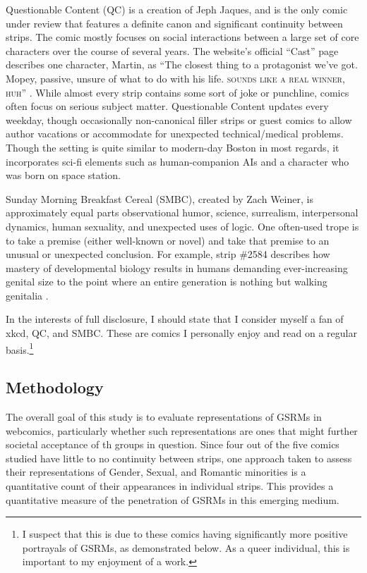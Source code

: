 \documentclass[man,12pt]{apa6}
\begin{document}
Questionable Content (QC) is a creation of Jeph Jaques, and is the only comic under review that features a definite canon and significant continuity between strips. The comic mostly focuses on social interactions between a large set of core characters over the course of several years. The website's official ``Cast'' page describes one character, Martin, as ``The closest thing to a protagonist we've got. Mopey, passive, unsure of what to do with his life. \textsc{sounds like a real winner, huh}'' \cite{qc}. While almost every strip contains some sort of joke or punchline, comics often focus on serious subject matter. Questionable Content updates every weekday, though occasionally non-canonical filler strips or guest comics to allow author vacations or accommodate for unexpected technical/medical problems. Though the setting is quite similar to modern-day Boston in most regards, it incorporates sci-fi elements such as human-companion AIs and a character who was born on space station.

Sunday Morning Breakfast Cereal (SMBC), created by Zach Weiner, is approximately equal parts observational humor, science, surrealism, interpersonal dynamics, human sexuality, and unexpected uses of logic. One often-used trope is to take a premise (either well-known or novel) and take that premise to an unusual or unexpected conclusion. For example, strip \#2584 describes how mastery of developmental biology results in humans demanding ever-increasing genital size to the point where an entire generation is nothing but walking genitalia \cite{smbc}.

In the interests of full disclosure, I should state that I consider myself a fan of xkcd, QC, and SMBC. These are comics I personally enjoy and read on a regular basis.\footnote{I suspect that this is due to these comics having significantly more positive portrayals of GSRMs, as demonstrated below. As a queer individual, this is important to my enjoyment of a work.} 

\subsection{Methodology}
The overall goal of this study is to evaluate representations of GSRMs in webcomics, particularly whether such representations are ones that might further societal acceptance of th groups in question. Since four out of the five comics studied have little to no continuity between strips, one approach taken to assess their representations of Gender, Sexual, and Romantic minorities is a quantitative count of their appearances in individual strips. This provides a quantitative measure of the penetration of GSRMs in this emerging medium. 
\end{document}
